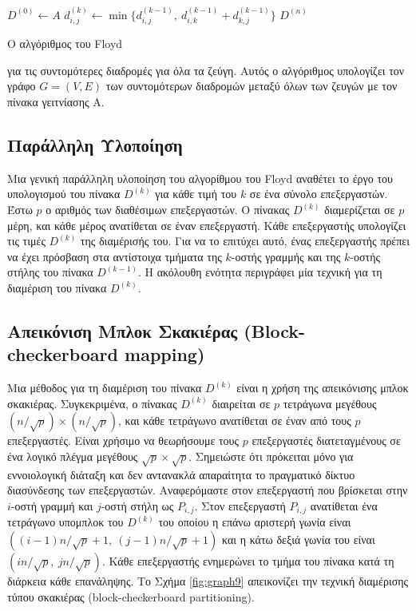 \documentclass[12pt,a4paper]{article} %
\begin{document}
{\begin{algorithm}[H]
\begin{algorithmic}[1]
    \State $D^{(0)} \gets A$
                \State $d_{i,j}^{(k)} \gets \min\{d_{i,j}^{(k-1)},\ d_{i,k}^{(k-1)} + d_{k,j}^{(k-1)}\}$
            \EndFor
        \EndFor
    \EndFor
    \State \Return $D^{(n)}$
\EndProcedure
\end{algorithmic}
\end{algorithm}

{\raggedright{} Ο αλγόριθμος του Floyd} για τις συντομότερες διαδρομές για όλα τα ζεύγη. Αυτός ο αλγόριθμος υπολογίζει τον γράφο $G=(V,E)$ των συντομότερων διαδρομών μεταξύ όλων των ζευγών με τον πίνακα γειτνίασης Α. \label{alg:floyd}\par
\vspace{0.3cm}

\subsection*{Παράλληλη Υλοποίηση}
Μια γενική παράλληλη υλοποίηση του αλγορίθμου του Floyd αναθέτει το έργο του υπολογισμού του πίνακα $D^{(k)}$ για κάθε τιμή του $k$ σε ένα σύνολο επεξεργαστών. Έστω $p$ ο αριθμός των διαθέσιμων επεξεργαστών. Ο πίνακας $D^{(k)}$ διαμερίζεται σε $p$ μέρη, και κάθε μέρος ανατίθεται σε έναν επεξεργαστή.
Κάθε επεξεργαστής υπολογίζει τις τιμές $D^{(k)}$ της διαμέρισής του. Για να το επιτύχει αυτό, ένας επεξεργαστής πρέπει να έχει πρόσβαση στα αντίστοιχα τμήματα της $k$-οστής γραμμής και της $k$-οστής στήλης του πίνακα $D^{(k-1)}$. Η ακόλουθη ενότητα περιγράφει μία τεχνική για τη διαμέριση του πίνακα $D^{(k)}$.

\subsection*{Απεικόνιση Μπλοκ Σκακιέρας (Block-checkerboard mapping)}
Μια μέθοδος για τη διαμέριση του πίνακα $D^{(k)}$ είναι η χρήση της απεικόνισης μπλοκ σκακιέρας. Συγκεκριμένα, ο πίνακας $D^{(k)}$ διαιρείται σε $p$ τετράγωνα μεγέθους $(n/\sqrt{p})\times(n/\sqrt{p})$, και κάθε τετράγωνο ανατίθεται σε έναν από τους $p$ επεξεργαστές. Είναι χρήσιμο να θεωρήσουμε τους $p$ επεξεργαστές διατεταγμένους σε ένα λογικό πλέγμα μεγέθους $\sqrt{p}\times\sqrt{p}$. Σημειώστε ότι πρόκειται μόνο για εννοιολογική διάταξη και δεν αντανακλά απαραίτητα το πραγματικό δίκτυο διασύνδεσης των επεξεργαστών. Αναφερόμαστε στον επεξεργαστή που βρίσκεται στην $i$-οστή γραμμή και $j$-οστή στήλη ως $P_{i,j}$. Στον επεξεργαστή $P_{i,j}$ ανατίθεται ένα τετράγωνο υπομπλοκ του $D^{(k)}$ του οποίου η επάνω αριστερή γωνία είναι
\mbox{$((i - 1)n/\sqrt{p} + 1,\ (j - 1)n/\sqrt{p} + 1)$}
και η κάτω δεξιά γωνία του είναι $(in/{\sqrt{p}},\ jn/{\sqrt{p}})$.
Κάθε επεξεργαστής ενημερώνει το τμήμα του πίνακα κατά τη διάρκεια κάθε επανάληψης. 
Το Σχήμα \ref{fig:graph9} απεικονίζει την τεχνική διαμέρισης τύπου σκακιέρας (block-checkerboard partitioning).

}
\end{document}
